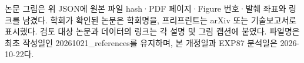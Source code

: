 


논문 그림은 위 JSON에 원본 파일 hash·PDF 페이지·Figure 번호·발췌 좌표와 링크를 남겼다. 학회가 확인된 논문은 학회명을, 프리프린트는 arXiv 또는 기술보고서로 표시했다. 검토 대상 논문과 데이터의 링크는 각 설명 및 그림 캡션에 붙였다. 파일명은 최초 작성일인 20261021\_\allowbreak{}references를 유지하며, 본 개정일과 EXP87 분석일은 2026-10-22다.



